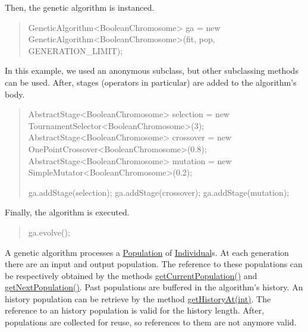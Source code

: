 Then, the genetic algorithm is instanced. 

\begin{quotation}



\begin{DoxyPre}
GeneticAlgorithm<BooleanChromosome> ga = new GeneticAlgorithm<BooleanChromosome>(fit, pop, GENERATION\_LIMIT);
\end{DoxyPre}


\end{quotation}


In this example, we used an anonymous subclass, but other subclassing methods can be used. After, stages (operators in particular) are added to the algorithm's body. 

\begin{quotation}



\begin{DoxyPre}
AbstractStage<BooleanChromosome> selection = new TournamentSelector<BooleanChromosome>(3);
AbstractStage<BooleanChromosome> crossover = new OnePointCrossover<BooleanChromosome>(0.8);
AbstractStage<BooleanChromosome> mutation = new SimpleMutator<BooleanChromosome>(0.2);\end{DoxyPre}



\begin{DoxyPre}ga.addStage(selection);
ga.addStage(crossover);
ga.addStage(mutation);
\end{DoxyPre}


\end{quotation}


Finally, the algorithm is executed. 

\begin{quotation}



\begin{DoxyPre}
ga.evolve();
\end{DoxyPre}


\end{quotation}


A genetic algorithm processes a \hyperlink{}{Population} of \hyperlink{}{Individual}s. At each generation there are an input and output population. The reference to these populations can be respectively obtained by the methods \hyperlink{classjenes_1_1_genetic_algorithm_3_01_t_01extends_01_chromosome_01_4_a855bc56ffb3e1704ced2fdf68cc96d8f}{get\-Current\-Population()} and \hyperlink{classjenes_1_1_genetic_algorithm_3_01_t_01extends_01_chromosome_01_4_a5d22b21350638a64a66d3599b2777982}{get\-Next\-Population()}. Past populations are buffered in the algorithm's history. An history population can be retrieve by the method \hyperlink{classjenes_1_1_genetic_algorithm_3_01_t_01extends_01_chromosome_01_4_a99718490498059da48833dfbdfc8076e}{get\-History\-At(int)}. The reference to an history population is valid for the history length. After, populations are collected for reuse, so references to them are not anymore valid. 

